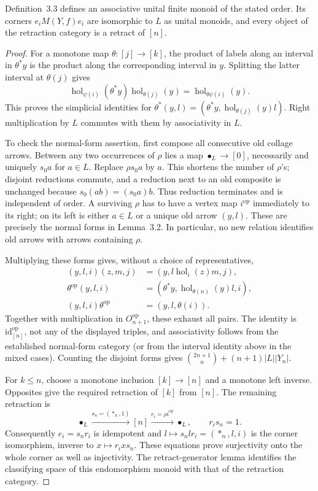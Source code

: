 \begin{lemma}
\label{lem:B-monoid}
Definition~3.3 defines an associative unital finite monoid of the stated
order.  Its corners $e_iM(Y,f)e_i$ are isomorphic to $L$ as unital
monoids, and every object of the retraction category is a retract of
$[n]$.
\end{lemma}
\begin{proof}
For a monotone map $\theta:[j]\to[k]$, the product of labels along an
interval in $\theta^*y$ is the product along the corresponding interval
in $y$.  Splitting the latter interval at $\theta(j)$ gives
\[
 \operatorname{hol}_{\psi(i)}(\theta^*y)
 \operatorname{hol}_{\theta(j)}(y)
 =\operatorname{hol}_{\theta\psi(i)}(y).
\]
This proves the simplicial identities for
$\theta^*(y,l)=(\theta^*y,\operatorname{hol}_{\theta(j)}(y)l)$.
Right multiplication by $L$ commutes with them by associativity in $L$.

To check the normal-form assertion, first compose all consecutive old
collage arrows.  Between any two occurrences of $\rho$ lies a map
$\bullet_L\to[0]$, necessarily and uniquely $s_0a$ for $a\in L$.
Replace $\rho s_0a$ by $a$.  This shortens the number of $\rho$'s;
disjoint reductions commute, and a reduction next to an old composite
is unchanged because $s_0(ab)=(s_0a)b$.  Thus reduction terminates and
is independent of order.  A surviving $\rho$ has to have a vertex
map $i^{\mathrm{op}}$ immediately to its right; on its left is either
$a\in L$ or a unique old arrow $(y,l)$.  These are precisely the
normal forms in Lemma~3.2.  In particular, no new relation identifies
old arrows with arrows containing $\rho$.

Multiplying these forms gives, without a choice of representatives,
\[
\begin{split}
 (y,l,i)(z,m,j)&=(y,l\operatorname{hol}_i(z)m,j),\\
 \theta^{\mathrm{op}}(y,l,i)&=
 (\theta^*y,\operatorname{hol}_{\theta(n)}(y)l,i),\\
 (y,l,i)\theta^{\mathrm{op}}&=(y,l,\theta(i)).
\end{split}
\]
Together with multiplication in $O_{n+1}^{\mathrm{op}}$, these exhaust
all pairs.  The identity is $\mathrm{id}_{[n]}^{\mathrm{op}}$, not any
of the displayed triples, and associativity follows from the established
normal-form category (or from the interval identity above in the mixed
cases).  Counting the disjoint forms gives
$\binom{2n+1}{n}+(n+1)|L||Y_n|$.

For $k\le n$, choose a monotone inclusion $[k]\to[n]$ and a monotone
left inverse.  Opposites give the required retraction of $[k]$ from
$[n]$.  The remaining retraction is
\[
 \bullet_L\xrightarrow{s_n=(*_n,1)}[n]
 \xrightarrow{r_i=\rho i^{\mathrm{op}}}\bullet_L,
 \qquad r_i s_n=1.
\]
Consequently $e_i=s_nr_i$ is idempotent and
$l\mapsto s_nlr_i=(*_n,l,i)$ is the corner isomorphism, inverse to
$x\mapsto r_i x s_n$.  These equations prove surjectivity onto the
whole corner as well as injectivity.  The retract-generator lemma
identifies the classifying space of this endomorphism monoid with that
of the retraction category.
\end{proof}

